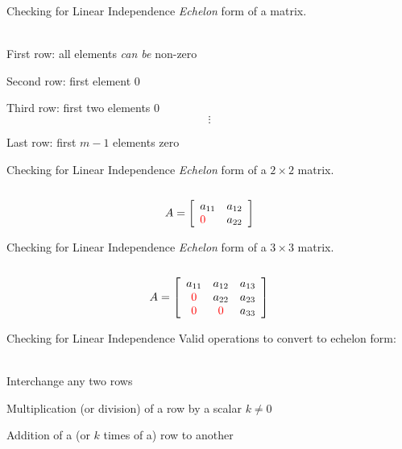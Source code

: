 \documentclass{./../../Latex/teaching_slides}
\begin{document}
\begin{frame}{Checking for Linear Independence}
\textit{Echelon} form of a matrix. \\~\\
\begin{witemize}
\item First row: all elements \textit{can be} non-zero
\item Second row: first element $0$
\item Third row: first two elements $0$
$$\vdots$$
\item Last row: first $m-1$ elements zero
\end{witemize}
\end{frame}

\begin{frame}{Checking for Linear Independence}
\textit{Echelon} form of a $2 \times 2$ matrix. \\~\\
$$
A=\left[\begin{array}{ll}
a_{11} & a_{12} \\
\textcolor{red}{0} & a_{22}
\end{array}\right]
$$
\end{frame}

\begin{frame}{Checking for Linear Independence}
\textit{Echelon} form of a $3 \times 3$ matrix. \\~\\
$$
A=\left[\begin{array}{ccc}
a_{11} & a_{12} & a_{13} \\
\textcolor{red}{0} & a_{22} & a_{23}  \\
\textcolor{red}{0} & \textcolor{red}{0} & a_{33}
\end{array}\right]
$$
\end{frame}

\begin{frame}{Checking for Linear Independence}
Valid operations to convert to echelon form:\\~\\
\begin{witemize}
\item Interchange any two rows
\item Multiplication (or division) of a row by a scalar $k \neq 0$
\item Addition of a (or $k$ times of a) row to another \\~\\
\end{witemize}
\end{frame}
\end{document}
